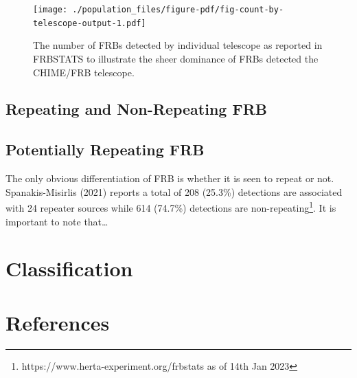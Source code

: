 \documentclass[english,singlespacedlisttitles]{umalayathesis}
\begin{document}
\begin{figure}

{\centering \texttt{[image: ./population\_files/figure-pdf/fig-count-by-telescope-output-1.pdf]}

}

\caption[\label{fig-count-by-telescope}The number of FRBs detected by
individual telescope as reported in FRBSTATS
to illustrate the sheer dominance of FRBs detected the CHIME/FRB
telescope.]{\label{fig-count-by-telescope}The number of FRBs detected by
individual telescope as reported in FRBSTATS\footnotemark{}
to illustrate the sheer dominance of FRBs detected the CHIME/FRB
telescope.}

\end{figure}

\hypertarget{repeating-and-non-repeating-frb}{%
\section{Repeating and Non-Repeating
FRB}\label{repeating-and-non-repeating-frb}}

\hypertarget{potentially-repeating-frb}{%
\section{Potentially Repeating FRB}\label{potentially-repeating-frb}}

The only obvious differentiation of FRB is whether it is seen to repeat
or not. Spanakis-Misirlis (2021) reports a total of 208 (25.3\%)
detections are associated with 24 repeater sources while 614 (74.7\%)
detections are non-repeating\footnote{https://www.herta-experiment.org/frbstats
  as of 14th Jan 2023}. It is important to note that\ldots{}


\hypertarget{classification}{%
\chapter{Classification}\label{classification}}


\hypertarget{references}{%
\chapter*{References}\label{references}}
\end{document}
